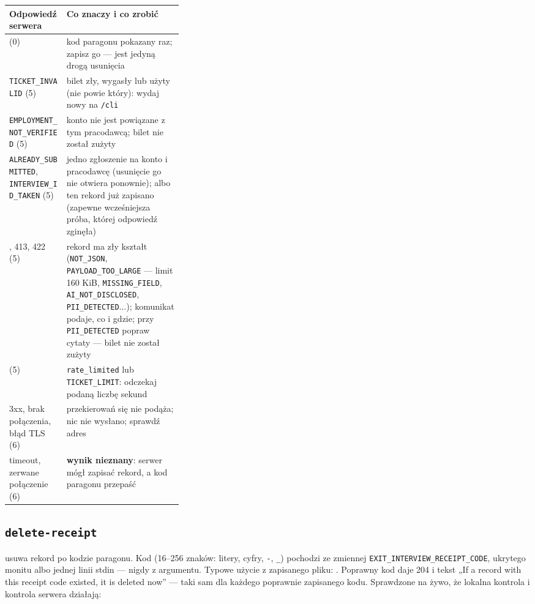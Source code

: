 {\begin{center}
\small
\begin{tabularx}{\linewidth}{@{}>{\raggedright\arraybackslash}p{0.33\linewidth}>{\raggedright\arraybackslash}X@{}}
\toprule
Odpowiedź serwera & Co znaczy i co zrobić \\
\midrule
201 (0) & kod paragonu pokazany raz; zapisz go --- jest jedyną drogą usunięcia \\
401 \texttt{TICKET\_INVALID} (5) & bilet zły, wygasły lub użyty (nie powie który): wydaj nowy na \texttt{/cli} \\
403 \texttt{EMPLOYMENT\_NOT\_VERIFIED} (5) & konto nie jest powiązane z tym pracodawcą; bilet nie został zużyty \\
409 \texttt{ALREADY\_SUBMITTED}, \texttt{INTERVIEW\_ID\_TAKEN} (5) & jedno zgłoszenie na konto i pracodawcę (usunięcie go nie otwiera ponownie); albo ten rekord już zapisano (zapewne wcześniejsza próba, której odpowiedź zginęła) \\
400, 413, 422 (5) & rekord ma zły kształt (\texttt{NOT\_JSON}, \texttt{PAYLOAD\_TOO\_LARGE} --- limit 160 KiB, \texttt{MISSING\_FIELD}, \texttt{AI\_NOT\_DISCLOSED}, \texttt{PII\_DETECTED}...); komunikat podaje, co i gdzie; przy \texttt{PII\_DETECTED} popraw cytaty --- bilet nie został zużyty \\
429 (5) & \texttt{rate\_limited} lub \texttt{TICKET\_LIMIT}: odczekaj podaną liczbę sekund \\
3xx, brak połączenia, błąd TLS (6) & przekierowań się nie podąża; nic nie wysłano; sprawdź adres \\
timeout, zerwane połączenie (6) & \textbf{wynik nieznany}: serwer mógł zapisać rekord, a kod paragonu przepaść \\
\bottomrule
\end{tabularx}
\end{center}

\subsection{\texttt{delete-receipt}}

 usuwa rekord po kodzie paragonu. Kod
(16--256 znaków: litery, cyfry, \texttt{-}, \texttt{\_}) pochodzi ze zmiennej
\texttt{EXIT\_\allowbreak{}INTERVIEW\_\allowbreak{}RECEIPT\_\allowbreak{}CODE}, ukrytego monitu albo jednej linii
stdin --- nigdy z argumentu. Typowe użycie z zapisanego pliku:
. Poprawny kod daje
204 i tekst „If a record with this receipt code existed, it is deleted now” ---
taki sam dla każdego poprawnie zapisanego kodu. Sprawdzone na żywo, że lokalna
kontrola i kontrola serwera działają:

}
